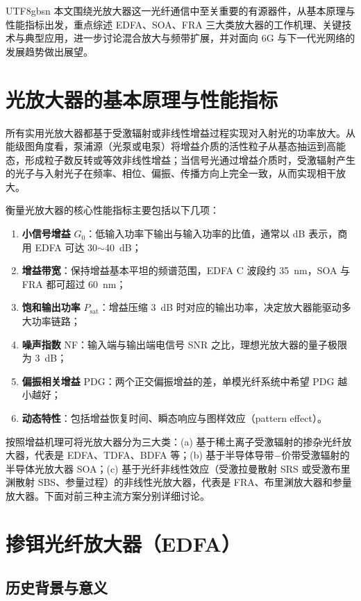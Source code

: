 \documentclass[11pt,a4paper]{article}
\begin{document}
\begin{CJK}{UTF8}{gbsn}
本文围绕光放大器这一光纤通信中至关重要的有源器件，从基本原理与性能指标出发，重点综述 EDFA、SOA、FRA 三大类放大器的工作机理、关键技术与典型应用，进一步讨论混合放大与频带扩展，并对面向 6G 与下一代光网络的发展趋势做出展望。

\section{光放大器的基本原理与性能指标}

所有实用光放大器都基于受激辐射或非线性增益过程实现对入射光的功率放大。从能级图角度看，泵浦源（光泵或电泵）将增益介质的活性粒子从基态抽运到高能态，形成粒子数反转或等效非线性增益；当信号光通过增益介质时，受激辐射产生的光子与入射光子在频率、相位、偏振、传播方向上完全一致，从而实现相干放大。

衡量光放大器的核心性能指标主要包括以下几项\cite{agrawal2010}：

\begin{enumerate}[leftmargin=2.5em,itemsep=2pt]
\item \textbf{小信号增益} $G_0$：低输入功率下输出与输入功率的比值，通常以 dB 表示，商用 EDFA 可达 30$\sim$40~dB；
\item \textbf{增益带宽}：保持增益基本平坦的频谱范围，EDFA C 波段约 35~nm，SOA 与 FRA 都可超过 60~nm；
\item \textbf{饱和输出功率} $P_{\mathrm{sat}}$：增益压缩 3~dB 时对应的输出功率，决定放大器能驱动多大功率链路；
\item \textbf{噪声指数} NF：输入端与输出端电信号 SNR 之比，理想光放大器的量子极限为 3~dB；
\item \textbf{偏振相关增益} PDG：两个正交偏振增益的差，单模光纤系统中希望 PDG 越小越好；
\item \textbf{动态特性}：包括增益恢复时间、瞬态响应与图样效应（pattern effect）。
\end{enumerate}

按照增益机理可将光放大器分为三大类：(a) 基于稀土离子受激辐射的掺杂光纤放大器，代表是 EDFA、TDFA、BDFA 等；(b) 基于半导体导带$-$价带受激辐射的半导体光放大器 SOA；(c) 基于光纤非线性效应（受激拉曼散射 SRS 或受激布里渊散射 SBS、参量过程）的非线性光放大器，代表是 FRA、布里渊放大器和参量放大器。下面对前三种主流方案分别详细讨论。

\section{掺铒光纤放大器（EDFA）}

\subsection{历史背景与意义}


\end{CJK}
\end{document}
